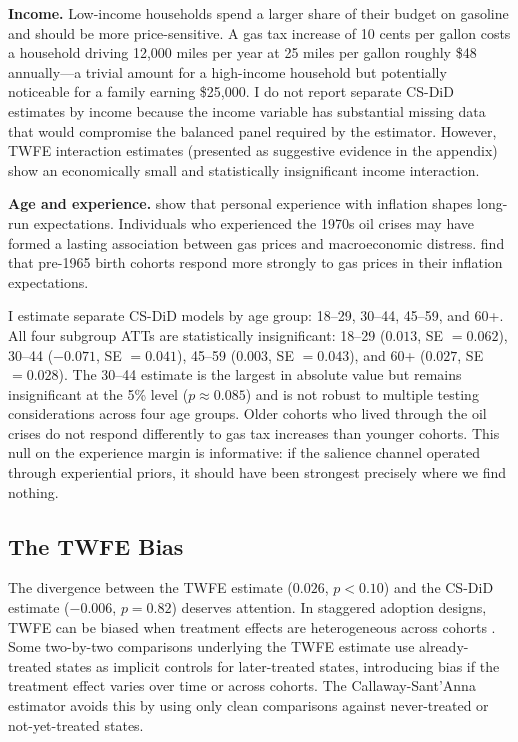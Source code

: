 \documentclass[12pt]{article}
\begin{document}
\textbf{Income.} Low-income households spend a larger share of their budget on gasoline and should be more price-sensitive. A gas tax increase of 10 cents per gallon costs a household driving 12,000 miles per year at 25 miles per gallon roughly \$48 annually---a trivial amount for a high-income household but potentially noticeable for a family earning \$25,000. I do not report separate CS-DiD estimates by income because the income variable has substantial missing data that would compromise the balanced panel required by the estimator. However, TWFE interaction estimates (presented as suggestive evidence in the appendix) show an economically small and statistically insignificant income interaction.

\textbf{Age and experience.} \citet{malmendier2016learning} show that personal experience with inflation shapes long-run expectations. Individuals who experienced the 1970s oil crises may have formed a lasting association between gas prices and macroeconomic distress. \citet{binder2022stuck} find that pre-1965 birth cohorts respond more strongly to gas prices in their inflation expectations.

I estimate separate CS-DiD models by age group: 18--29, 30--44, 45--59, and 60+. All four subgroup ATTs are statistically insignificant: 18--29 ($0.013$, SE $= 0.062$), 30--44 ($-0.071$, SE $= 0.041$), 45--59 ($0.003$, SE $= 0.043$), and 60+ ($0.027$, SE $= 0.028$). The 30--44 estimate is the largest in absolute value but remains insignificant at the 5\% level ($p \approx 0.085$) and is not robust to multiple testing considerations across four age groups. Older cohorts who lived through the oil crises do not respond differently to gas tax increases than younger cohorts. This null on the experience margin is informative: if the salience channel operated through experiential priors, it should have been strongest precisely where we find nothing.

\subsection{The TWFE Bias}

The divergence between the TWFE estimate ($0.026$, $p < 0.10$) and the CS-DiD estimate ($-0.006$, $p = 0.82$) deserves attention. In staggered adoption designs, TWFE can be biased when treatment effects are heterogeneous across cohorts \citep{goodman2021difference, sun2021estimating}. Some two-by-two comparisons underlying the TWFE estimate use already-treated states as implicit controls for later-treated states, introducing bias if the treatment effect varies over time or across cohorts. The Callaway-Sant'Anna estimator avoids this by using only clean comparisons against never-treated or not-yet-treated states.
\end{document}
